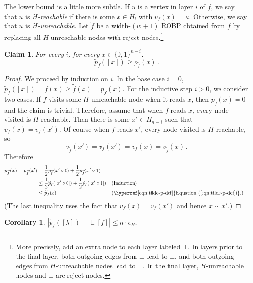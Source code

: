 \documentclass[10pt,a4paper]{article}
\newtheorem{claim}[theorem]{Claim}
\newtheorem{corollary}[theorem]{Corollary}
\DeclareMathOperator*{\ExpVal}{\mathbb E}
\newcommand{\expeqref}[2]{\hyperref[#2]{#1~(\ref*{#2})}}
\begin{document}
The lower bound is a little more subtle. If $u$ is a vertex in layer $i$ of $f$, we say that $u$ is \emph{$H$-reachable} if there is some $x \in H_i$ with $v_f(x) = u$. Otherwise, we say that $u$ is \emph{$H$-unreachable}. Let $\widetilde{f}$ be a width-$(w + 1)$ ROBP obtained from $f$ by replacing all $H$-unreachable nodes with reject nodes.\footnote{More precisely, add an extra node to each layer labeled $\bot$. In layers prior to the final layer, both outgoing edges from $\bot$ lead to $\bot$, and both outgoing edges from $H$-unreachable nodes lead to $\bot$. In the final layer, $H$-unreachable nodes and $\bot$ are reject nodes.}

\begin{claim} \label{clm:const-width-lb}
For every $i$, for every $x \in \{0, 1\}^{n - i}$,
$$
\widetilde{p}_f([x]) \geq p_{\widetilde{f}}(x)\,.
$$
\end{claim}

\begin{proof}
We proceed by induction on $i$. In the base case $i = 0$, $\widetilde{p}_f([x]) = f(x) \geq \widetilde{f}(x) = p_{\widetilde{f}}(x)$. For the inductive step $i > 0$, we consider two cases. If $f$ visits some $H$-unreachable node when it reads $x$, then $p_{\widetilde{f}}(x) = 0$ and the claim is trivial. Therefore, assume that when $f$ reads $x$, every node visited is $H$-reachable. Then there is some $x' \in H_{n - i}$ such that $v_f(x) = v_f(x')$. Of course when $f$ reads $x'$, every node visited is $H$-reachable, so
$$
v_{\widetilde{f}}(x') = v_f(x') = v_f(x) = v_{\widetilde{f}}(x)\,.
$$
Therefore,
\begin{align*}
p_{\widetilde{f}}(x) = p_{\widetilde{f}}(x') &= \frac{1}{2} p_{\widetilde{f}}(x' \circ 0) + \frac{1}{2} p_{\widetilde{f}}(x' \circ 1) \\
&\leq \frac{1}{2} \widetilde{p}_f([x' \circ 0]) + \frac{1}{2} \widetilde{p}_f([x' \circ 1]) && \text{(Induction)} \\
&\leq \widetilde{p}_f(x) && (\text{\expeqref{Equation}{eqn:tilde-p-def}.})
\end{align*}
(The last inequality uses the fact that $v_f(x) = v_f(x')$ and hence $x \sim x'$.)
\end{proof}

\begin{corollary} \label{cor:tilde-p-error}
$|\widetilde{p}_f([\lambda]) - \ExpVal[f]| \leq n \cdot \epsilon_H$.
\end{corollary}
\end{document}

